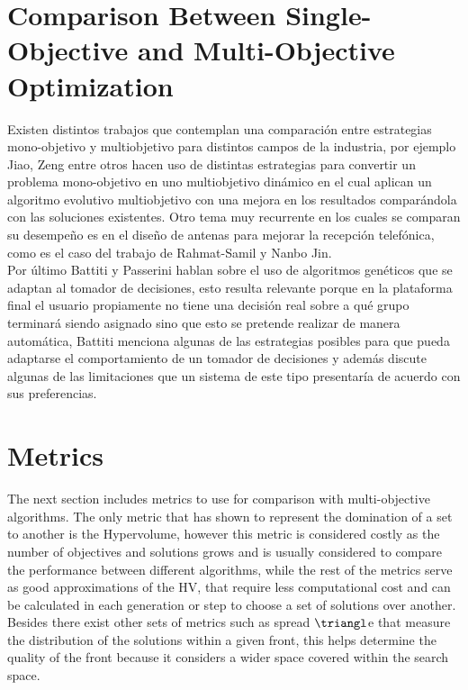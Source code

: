 \section{Comparison Between Single-Objective and Multi-Objective Optimization}
Existen distintos trabajos que contemplan una comparación entre estrategias mono-objetivo y multiobjetivo para distintos campos de la industria, por ejemplo Jiao, Zeng\cite{Jiao2017DynamicME} entre otros hacen uso de distintas estrategias para convertir un problema mono-objetivo en uno multiobjetivo dinámico en el cual aplican un algoritmo evolutivo multiobjetivo con una mejora en los resultados comparándola con las soluciones existentes. Otro tema muy recurrente en los cuales se comparan su desempeño es en el diseño de antenas para mejorar la recepción telefónica, como es el caso del trabajo de Rahmat-Samil y Nanbo Jin.\cite{Jin2007-qu}\\ 

Por último Battiti y Passerini\cite{Battiti2010-xo} hablan sobre el uso de algoritmos genéticos que se adaptan al tomador de decisiones, esto resulta relevante porque en la plataforma final el usuario propiamente no tiene una decisión real sobre a qué grupo terminará siendo asignado sino que esto se pretende realizar de manera automática, Battiti menciona algunas de las estrategias posibles para que pueda adaptarse el comportamiento de un tomador de decisiones y además discute algunas de las limitaciones que un sistema de este tipo presentaría de acuerdo con sus preferencias.\cite{Wang2010-zh}\\

\section{Metrics}

The next section includes metrics to use for comparison with multi-objective algorithms. The only metric that has shown to represent the domination of a set to another is the Hypervolume, however this metric is considered costly as the number of objectives and solutions grows and is usually considered to compare the performance between different algorithms, while the rest of the metrics serve as good approximations of the HV, that require less computational cost and can be calculated in each generation or step to choose a set of solutions over another. Besides there exist other sets of metrics such as spread $\triangl$e that measure the distribution of the solutions within a given front, this helps determine the quality of the front because it considers a wider space covered within the search space.

